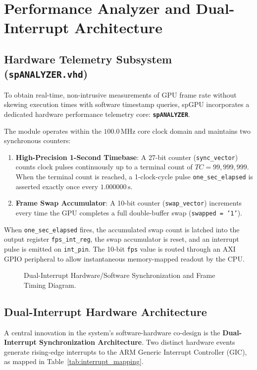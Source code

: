 \chapter{Performance Analyzer and Dual-Interrupt Architecture}
\label{chap:analyzer_interrupts}

\section{Hardware Telemetry Subsystem (\texttt{spANALYZER.vhd})}
To obtain real-time, non-intrusive measurements of GPU frame rate without skewing execution times with software timestamp queries, spGPU incorporates a dedicated hardware performance telemetry core: \textbf{\texttt{spANALYZER}}.

The module operates within the $100.0\,\text{MHz}$ core clock domain and maintains two synchronous counters:
\begin{enumerate}
    \item \textbf{High-Precision 1-Second Timebase}: A 27-bit counter (\texttt{sync\_vector}) counts clock pulses continuously up to a terminal count of $TC = 99{,}999{,}999$. When the terminal count is reached, a 1-clock-cycle pulse \texttt{one\_sec\_elapsed} is asserted exactly once every $1.000000\,\text{s}$.
    \item \textbf{Frame Swap Accumulator}: A 10-bit counter (\texttt{swap\_vector}) increments every time the GPU completes a full double-buffer swap (\texttt{swapped = '1'}).
\end{enumerate}

When \texttt{one\_sec\_elapsed} fires, the accumulated swap count is latched into the output register \texttt{fps\_int\_reg}, the swap accumulator is reset, and an interrupt pulse is emitted on \texttt{int\_pin}. The 10-bit \texttt{fps} value is routed through an AXI GPIO peripheral to allow instantaneous memory-mapped readout by the CPU.

\begin{figure}[htbp]
\centering
\resizebox{0.95\textwidth}{!}{
    
}
\caption{Dual-Interrupt Hardware/Software Synchronization and Frame Timing Diagram.}
\label{fig:dual_interrupts}
\end{figure}

\section{Dual-Interrupt Hardware Architecture}
A central innovation in the system's software-hardware co-design is the \textbf{Dual-Interrupt Synchronization Architecture}. Two distinct hardware events generate rising-edge interrupts to the ARM Generic Interrupt Controller (GIC), as mapped in Table~\ref{tab:interrupt_mapping}.

